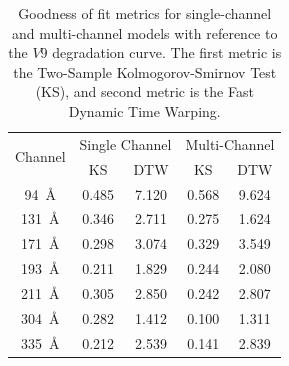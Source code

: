 \documentclass{aa}
\begin{document}
\begin{table}[h]
  \centering
  \caption{Goodness of fit metrics for single-channel and multi-channel models with reference to the $V9$ degradation curve. The first metric is the Two-Sample Kolmogorov-Smirnov Test (KS), and second metric is the Fast Dynamic Time Warping.}
  \label{tab:quantities_degradation}
  \centering
  \begin{tabular}{ccccc}
    \toprule
    \multirow{2}{*}{Channel} & \multicolumn{2}{c}{{\centering Single Channel}} &  \multicolumn{2}{c}{{\centering Multi-Channel}}  \\
    \cmidrule(lr){2-3}\cmidrule(lr){4-5}
     & KS & DTW &  KS & DTW\\
     \midrule
     94~\AA  &  0.485 & 7.120 &  0.568 & 9.624\\
     131~\AA &  0.346 & 2.711 &  0.275 & 1.624\\
     171~\AA &  0.298 & 3.074 &  0.329 & 3.549\\
     193~\AA &  0.211 & 1.829 &  0.244 & 2.080\\
     211~\AA &  0.305 & 2.850 &  0.242 & 2.807\\
     304~\AA &  0.282 & 1.412 &  0.100 & 1.311\\
     335~\AA &  0.212 & 2.539 &  0.141 & 2.839\\
     \bottomrule
  \end{tabular}
\end{table}

\end{document}

